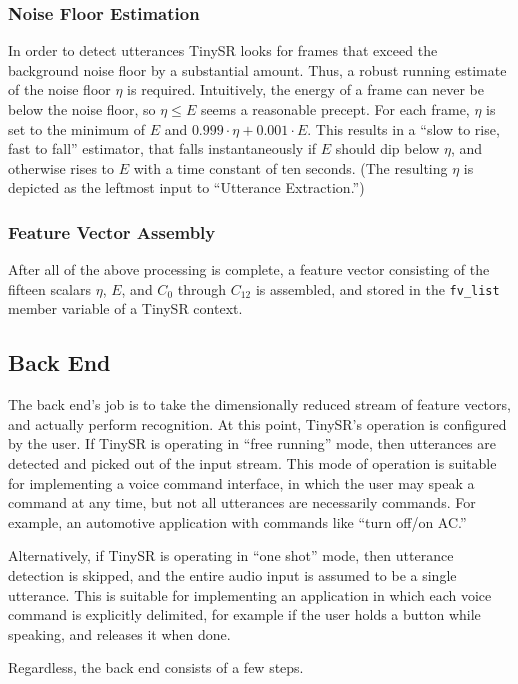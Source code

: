 \documentclass{article}
\begin{document}
\subsubsection{Noise Floor Estimation}
In order to detect utterances TinySR looks for frames that exceed the background noise floor by a substantial amount.
Thus, a robust running estimate of the noise floor $\eta$ is required.
Intuitively, the energy of a frame can never be below the noise floor, so $\eta \le E$ seems a reasonable precept.
For each frame, $\eta$ is set to the minimum of $E$ and $0.999 \cdot \eta + 0.001 \cdot E$.
This results in a ``slow to rise, fast to fall'' estimator, that falls instantaneously if $E$ should dip below $\eta$, and otherwise rises to $E$ with a time constant of ten seconds.
(The resulting $\eta$ is depicted as the leftmost input to ``Utterance Extraction.'')

\subsubsection{Feature Vector Assembly}
After all of the above processing is complete, a feature vector consisting of the fifteen scalars $\eta$, $E$, and $C_0$ through $C_{12}$ is assembled, and stored in the \texttt{fv\_list} member variable of a TinySR context.

\subsection{Back End}
The back end's job is to take the dimensionally reduced stream of feature vectors, and actually perform recognition.
At this point, TinySR's operation is configured by the user.
If TinySR is operating in ``free running'' mode, then utterances are detected and picked out of the input stream.
This mode of operation is suitable for implementing a voice command interface, in which the user may speak a command at any time, but not all utterances are necessarily commands.
For example, an automotive application with commands like ``turn off/on AC.''

Alternatively, if TinySR is operating in ``one shot'' mode, then utterance detection is skipped, and the entire audio input is assumed to be a single utterance.
This is suitable for implementing an application in which each voice command is explicitly delimited, for example if the user holds a button while speaking, and releases it when done.

Regardless, the back end consists of a few steps.
\end{document}
